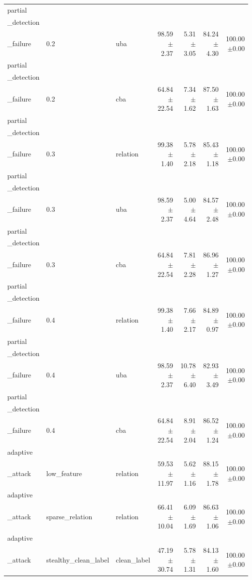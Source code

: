 \begin{table}[t]
\begin{tabular}{lllrrrr}
partial\\_detection\\_failure & 0.2 & uba & 98.59$\pm$2.37 & 5.31$\pm$3.05 & 84.24$\pm$4.30 & 100.00$\pm$0.00 \\
partial\\_detection\\_failure & 0.2 & cba & 64.84$\pm$22.54 & 7.34$\pm$1.62 & 87.50$\pm$1.63 & 100.00$\pm$0.00 \\
partial\\_detection\\_failure & 0.3 & relation & 99.38$\pm$1.40 & 5.78$\pm$2.18 & 85.43$\pm$1.18 & 100.00$\pm$0.00 \\
partial\\_detection\\_failure & 0.3 & uba & 98.59$\pm$2.37 & 5.00$\pm$4.64 & 84.57$\pm$2.48 & 100.00$\pm$0.00 \\
partial\\_detection\\_failure & 0.3 & cba & 64.84$\pm$22.54 & 7.81$\pm$2.28 & 86.96$\pm$1.27 & 100.00$\pm$0.00 \\
partial\\_detection\\_failure & 0.4 & relation & 99.38$\pm$1.40 & 7.66$\pm$2.17 & 84.89$\pm$0.97 & 100.00$\pm$0.00 \\
partial\\_detection\\_failure & 0.4 & uba & 98.59$\pm$2.37 & 10.78$\pm$6.40 & 82.93$\pm$3.49 & 100.00$\pm$0.00 \\
partial\\_detection\\_failure & 0.4 & cba & 64.84$\pm$22.54 & 8.91$\pm$2.04 & 86.52$\pm$1.24 & 100.00$\pm$0.00 \\
adaptive\\_attack & low_feature & relation & 59.53$\pm$11.97 & 5.62$\pm$1.16 & 88.15$\pm$1.78 & 100.00$\pm$0.00 \\
adaptive\\_attack & sparse_relation & relation & 66.41$\pm$10.04 & 6.09$\pm$1.69 & 86.63$\pm$1.06 & 100.00$\pm$0.00 \\
adaptive\\_attack & stealthy_clean_label & clean_label & 47.19$\pm$30.74 & 5.78$\pm$1.31 & 84.13$\pm$1.60 & 100.00$\pm$0.00 \\
\bottomrule
\end{tabular}
\end{table}
